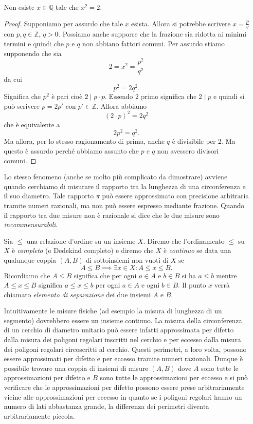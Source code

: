 \documentclass[italian,a4paper,hidelinks,headinclude]{scrartcl}
\newcommand{\ZZ}{{\mathbb Z}}
\newcommand{\QQ}{{\mathbb Q}}
\newcommand{\myemph}[1]{\emph{#1}\marginpar{#1}}
\begin{document}
\begin{theorem}[Pitagora]
  Non esiste $x\in \QQ$ tale che $x^2=2$.
\end{theorem}
%
\begin{proof}
  Supponiamo per assurdo che tale $x$ esista. Allora si potrebbe
  scrivere $x=\frac{p}{q}$ con $p,q\in \ZZ$, $q>0$.
  Possiamo anche supporre che la frazione sia ridotta ai minimi termini
  e quindi che $p$ e $q$ non abbiano fattori comuni.
  Per assurdo stiamo supponendo che sia
  \[
    2 = x^2= \frac{p^2}{q^2}
  \]
  da cui
  \[
   p^2 = 2 q^2.
  \]
  Significa che $p^2$ è pari cioè $2\mid p\cdot p$.
  Essendo $2$ primo significa che $2 \mid p$ e quindi si può
  scrivere $p=2p'$ con $p'\in \ZZ$. Allora abbiamo
  \[
    (2\cdot p)^2 = 2 q^2
  \]
  che è equivalente a
  \[
    2 p^2 = q^2.
  \]
  Ma allora, per lo stesso ragionamento di prima, anche $q$ è divisibile per
  $2$. Ma questo è assurdo perché abbiamo assunto che $p$ e $q$ non avessero
  divisori comuni.
\end{proof}

Lo stesso fenomeno (anche se molto più complicato da dimostrare) avviene quando cerchiamo di misurare il rapporto tra la lunghezza di una circonferenza e il suo diametro. Tale rapporto $\pi$ può essere approssimato con precisione arbitraria tramite numeri razionali, ma non può essere espresso mediante frazione.
Quando il rapporto tra due misure non è razionale si dice che le due misure sono \emph{incommensurabili}.

\begin{definition}
Sia $\le$ una relazione d'ordine su un insieme $X$.
Diremo che l'ordinamento $\le$ su $X$ è \myemph{completo} (o Dedekind completo)
e diremo che $X$ è \emph{continuo}
se data una qualunque coppia $(A,B)$ di sottoinsiemi non vuoti di $X$
se
\[
  A\le B \implies \exists x\in X \colon A\le x \le B.
\]
Ricordiamo che $A\le B$ significa che per ogni $a\in A$ e $b\in B$ si ha $a\le b$
mentre $A\le x \le B$ significa $a\le x \le b$ per ogni $a\in A$ e ogni $b\in B$.
Il punto $x$ verrà chiamato \myemph{elemento di separazione} dei due insiemi
$A$ e $B$.
\end{definition}

Intuitivamente le misure fisiche (ad esempio la misura di lunghezza di un segmento)
dovrebbero essere un insieme continuo. La misura della circonferenza di
un cerchio di diametro unitario può essere infatti approssimata per difetto
dalla misura dei poligoni regolari inscritti nel cerchio e per eccesso dalla
misura dei poligoni regolari circoscritti al cerchio. Questi perimetri,
a loro volta, possono essere approssimati per difetto e per eccesso tramite
numeri razionali. Dunque è possibile trovare una coppia di insiemi di misure
$(A,B)$ dove $A$ sono tutte le approssimazioni per difetto e $B$ sono tutte le
approssimazioni per eccesso e si può verificare che le approssimazioni
per difetto possono essere prese arbitrariamente vicine alle approssimazioni per
eccesso in quanto se i poligoni regolari hanno un numero di lati
abbastanza grande, la differenza dei perimetri diventa arbitrariamente piccola.
\end{document}
